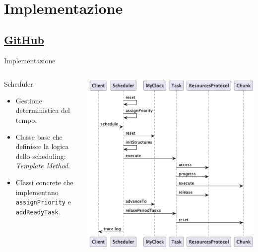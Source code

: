 \section{Implementazione}
\subsection{\href{https://github.com/edoardosarri24/real-time-scheduling-simulator.git}{GitHub}}

\begin{frame}{Implementazione}
    \begin{columns}
        \begin{column}{.4\textwidth}
            \begin{block}{Scheduler}
                \begin{itemize}
                    \item Gestione deterministica del tempo.
                    \item Classe base che definisce la logica dello scheduling: \textit{Template Method}.
                    \item Classi concrete che implementano \texttt{assignPriority} e \texttt{addReadyTask}.
                \end{itemize}
            \end{block}
        \end{column}
        \begin{column}{.6\textwidth}
            \centering
            \includegraphics[width=\textwidth]{images/3-implementazione/sequence diagram.pdf}
        \end{column}
    \end{columns}
\end{frame}

